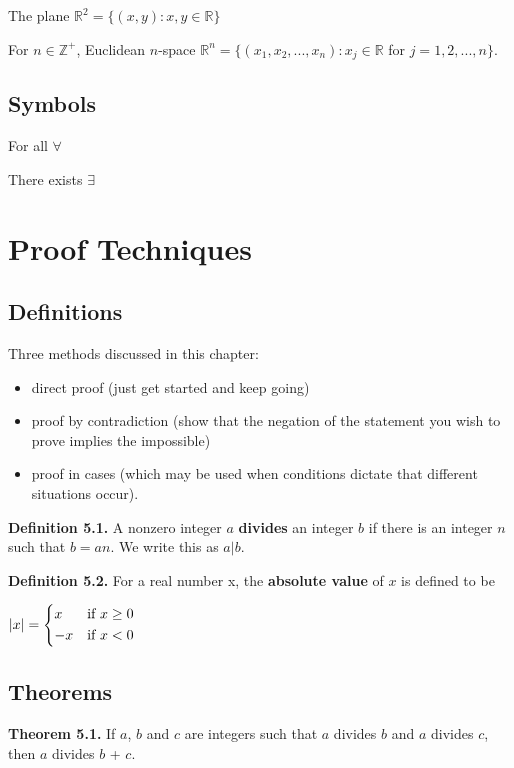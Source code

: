 \documentclass{article}
\begin{document}
The plane $\mathbb{R}^2 = \{(x,y) : x,y \in \mathbb{R} \}$

For $n \in \mathbb{Z}^+$, Euclidean $n$-space 
	$\mathbb{R}^n = \{(x_{1},x_{2},...,x_{n}) : x_{j} \in \mathbb{R}$ for $j=1,2,...,n \}$.
	
\subsection{Symbols}
For all $\forall$

There exists $\exists$

\section{Proof Techniques}
\subsection{Definitions}
Three methods discussed in this chapter:
\begin{itemize}
	\item direct proof (just get started and keep going)
	\item proof by contradiction (show that the negation of the statement you wish to prove implies the impossible)
	\item proof in cases (which may be used when conditions dictate that different situations occur).
\end{itemize}

\textbf{Definition 5.1.} A nonzero integer $a$ \textbf{divides} an integer $b$ if there is an integer $n$ such that $b = an$. We write this as $a|b$.

\textbf{Definition 5.2.} For a real number x, the \textbf{absolute value} of $x$ is defined to be

\begin{center}
	\begin{math}
		|x| =
			\begin{cases*}
				 x & if $x \geq 0$ \\
				-x & if $x < 0$
			\end{cases*}
	\end{math}
\end{center}

\subsection{Theorems}
\textbf{Theorem 5.1.} If $a$, $b$ and $c$ are integers such that $a$ divides $b$ and $a$ divides $c$, then $a$ divides $b$ + $c$.
\end{document}
